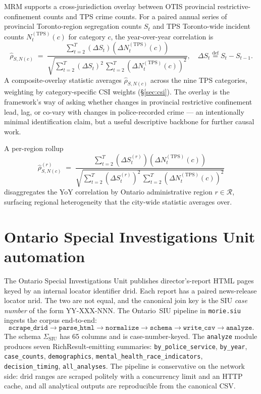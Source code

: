 \documentclass[11pt,a4paper]{article}
\theoremstyle{plain}
\theoremstyle{definition}
\theoremstyle{remark}
\newcommand{\eqdef}{\mathrel{\stackrel{\mathrm{def}}{=}}}
\begin{document}
MRM supports a cross-jurisdiction overlay between OTIS
provincial restrictive-confinement counts and TPS crime counts.
For a paired annual series of provincial Toronto-region
segregation counts $S_{t}$ and TPS Toronto-wide incident counts
$N^{(\mathrm{TPS})}_{t}(c)$ for category $c$, the year-over-year
correlation is
\begin{equation}
  \widehat{\rho}_{S, N(c)}
  \;=\;
   \frac{\sum_{t=2}^{T}
         (\Delta S_{t})(\Delta N^{(\mathrm{TPS})}_{t}(c))}
        {\sqrt{\sum_{t=2}^{T} (\Delta S_{t})^{2}\,
               \sum_{t=2}^{T} (\Delta N^{(\mathrm{TPS})}_{t}(c))^{2}}},
  \quad
  \Delta S_{t} \eqdef S_{t} - S_{t-1}.
  \label{eq:overlay-yoy}
\end{equation}
A composite-overlay statistic averages
$\widehat{\rho}_{S, N(c)}$ across the nine TPS categories,
weighting by category-specific CSI weights (\S\ref{sec:csi}). The
overlay is the framework's way of asking whether changes in
provincial restrictive confinement lead, lag, or co-vary with
changes in police-recorded crime --- an intentionally minimal
identification claim, but a useful descriptive backbone for
further causal work.

A per-region rollup
\begin{equation}
  \widehat{\rho}_{S, N(c)}^{(r)}
  \;=\;
   \frac{\sum_{t=2}^{T}
         (\Delta S^{(r)}_{t})(\Delta N^{(\mathrm{TPS})}_{t}(c))}
        {\sqrt{\sum_{t=2}^{T} (\Delta S^{(r)}_{t})^{2}\,
               \sum_{t=2}^{T} (\Delta N^{(\mathrm{TPS})}_{t}(c))^{2}}}
  \label{eq:overlay-region}
\end{equation}
disaggregates the YoY correlation by Ontario administrative
region $r \in \mathcal{R}$, surfacing regional heterogeneity that
the city-wide statistic averages over.

\section{Ontario Special Investigations Unit automation}
\label{sec:siu-ontario}

The Ontario Special Investigations Unit publishes
director's-report HTML pages keyed by an internal locator
identifier $\mathrm{drid}$. Each report has a paired news-release
locator $\mathrm{nrid}$. The two are not equal, and the canonical
join key is the SIU \emph{case number} of the form
$\mathrm{YY\text{-}XXX\text{-}NNN}$. The Ontario~SIU pipeline in
\texttt{morie.siu} ingests the corpus end-to-end:
\begin{equation}
  \texttt{scrape\_drid} \to \texttt{parse\_html}
  \to \texttt{normalize} \to \texttt{schema}
  \to \texttt{write\_csv} \to \texttt{analyze}.
  \label{eq:siu-pipeline}
\end{equation}
The schema $\Sigma_{\mathrm{SIU}}$ has 65 columns and is
case-number-keyed. The \texttt{analyze} module produces seven
RichResult-emitting summaries: \texttt{by\_police\_service},
\texttt{by\_year}, \texttt{case\_counts}, \texttt{demographics},
\texttt{mental\_health\_race\_indicators},
\texttt{decision\_timing}, \texttt{all\_analyses}. The pipeline
is conservative on the network side: $\mathrm{drid}$ ranges are
scraped politely with a concurrency limit and an HTTP cache, and
all analytical outputs are reproducible from the canonical CSV.
\end{document}
